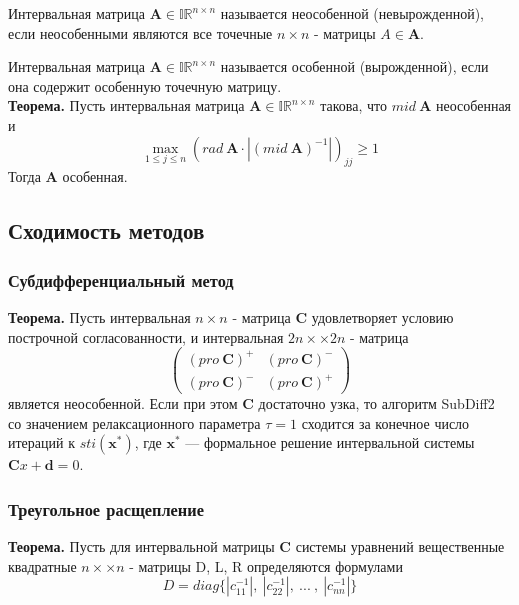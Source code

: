 \documentclass{article}
\begin{document}
        Интервальная матрица $\textbf{A} \in \mathbb{I}\mathbb{R}^{n \times n}$ называется неособенной (невырожденной), если неособенными являются все точечные $n \times n$ - матрицы $A \in \textbf{A}$.  
        
        Интервальная матрица $\textbf{A} \in \mathbb{I}\mathbb{R}^{n \times n}$ называется особенной (вырожденной), если она содержит особенную точечную матрицу.\\ 
        
        \textbf{Теорема.}
         Пусть интервальная матрица  $\textbf{A} \in \mathbb{I}\mathbb{R}^{n \times n}$ такова, что $mid \ \textbf{A}$ неособенная и 
         \begin{equation*}
             \max\limits_{1 \leq j \leq n} ( rad \ \textbf{A} \cdot |(mid \  \textbf{A})^{-1}|)_{jj} \geq 1
         \end{equation*}
        Тогда \textbf{A} особенная.
        
        
    \subsection{Сходимость методов}
        \subsubsection{Субдифференциальный метод}
        \textbf{Теорема.}
        Пусть интервальная $n \times n$ - матрица $\textbf{C}$ удовлетворяет условию построчной согласованности, и интервальная $2n ×\times 2n$ - матрица
        \begin{equation*}
            \begin{pmatrix}
              (pro \ \textbf{C})^+ & (pro \ \textbf{C})^- \\
              (pro \ \textbf{C})^-& (pro \ \textbf{C})^+
            \end{pmatrix}
        \end{equation*}
        является неособенной. Если при этом \textbf{C} достаточно узка, то алгоритм SubDiff2 со значением релаксационного параметра $\tau = 1$ сходится за конечное число итераций к $sti (\textbf{x}^*)$, где $\textbf{x}^*$ — формальное
        решение интервальной системы $\textbf{C}x + \textbf{d} = 0$.
        
        
        \subsubsection{Треугольное расщепление}
        \textbf{Теорема.}
        Пусть для интервальной матрицы \textbf{C} системы уравнений  вещественные квадратные $n ×\times n$ - матрицы D, L, R определяются формулами
        \begin{equation*}
            D = diag\{|c_{11}^{-1}|, \ |c_{22}^{-1}|, \ ... \ , \ |c_{nn}^{-1}|\}
        \end{equation*}
        
\end{document}
